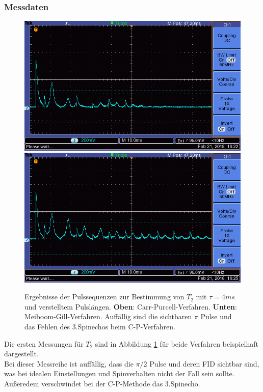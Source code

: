 \documentclass[12pt,a4paper]{article}
\begin{document}
\subsubsection{Messdaten}\label{sec:T2messdaten}
\begin{figure}
\centering
\includegraphics[scale=0.8]{Bilder/T2CP.png}
\includegraphics[scale=0.8]{Bilder/T2MG.png}
\caption{Ergebnisse der Pulssequenzen zur Bestimmung von $T_2$ mit $\tau = 4ms$ und verstelltem Pulslängen. \textbf{Oben}: Carr-Purcell-Verfahren. \textbf{Unten}: Meiboom-Gill-Verfahren. Auffällig sind die sichtbaren $\pi$ Pulse und das Fehlen des 3.Spinechos beim C-P-Verfahren.}
\label{fig:T2Daten}
\end{figure}

Die ersten Messungen für $T_2$ sind in Abbildung \ref{fig:T2Daten} für beide Verfahren beispielhaft dargestellt.\\
Bei dieser Messreihe ist auffällig, dass die $\pi/2$ Pulse und deren FID sichtbar sind, was bei idealen Einstellungen und Spinverhalten nicht der Fall sein sollte. Außeredem verschwindet bei der C-P-Methode das 3.Spinecho.
\end{document}
